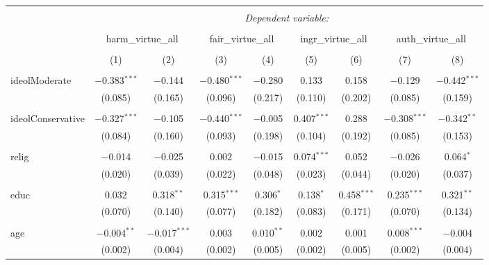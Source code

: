 
\begin{table}[!htbp] \centering 
  \caption{} 
  \label{} 
\begin{tabular}{@{\extracolsep{5pt}}lcccccccc} 
\\[-1.8ex]\hline 
\hline \\[-1.8ex] 
 & \multicolumn{8}{c}{\textit{Dependent variable:}} \\ 
\cline{2-9} 
\\[-1.8ex] & \multicolumn{2}{c}{harm\_virtue\_all} & \multicolumn{2}{c}{fair\_virtue\_all} & \multicolumn{2}{c}{ingr\_virtue\_all} & \multicolumn{2}{c}{auth\_virtue\_all} \\ 
\\[-1.8ex] & (1) & (2) & (3) & (4) & (5) & (6) & (7) & (8)\\ 
\hline \\[-1.8ex] 
 ideolModerate & $-$0.383$^{***}$ & $-$0.144 & $-$0.480$^{***}$ & $-$0.280 & 0.133 & 0.158 & $-$0.129 & $-$0.442$^{***}$ \\ 
  & (0.085) & (0.165) & (0.096) & (0.217) & (0.110) & (0.202) & (0.085) & (0.159) \\ 
  & & & & & & & & \\ 
 ideolConservative & $-$0.327$^{***}$ & $-$0.105 & $-$0.440$^{***}$ & $-$0.005 & 0.407$^{***}$ & 0.288 & $-$0.308$^{***}$ & $-$0.342$^{**}$ \\ 
  & (0.084) & (0.160) & (0.093) & (0.198) & (0.104) & (0.192) & (0.085) & (0.153) \\ 
  & & & & & & & & \\ 
 relig & $-$0.014 & $-$0.025 & 0.002 & $-$0.015 & 0.074$^{***}$ & 0.052 & $-$0.026 & 0.064$^{*}$ \\ 
  & (0.020) & (0.039) & (0.022) & (0.048) & (0.023) & (0.044) & (0.020) & (0.037) \\ 
  & & & & & & & & \\ 
 educ & 0.032 & 0.318$^{**}$ & 0.315$^{***}$ & 0.306$^{*}$ & 0.138$^{*}$ & 0.458$^{***}$ & 0.235$^{***}$ & 0.321$^{**}$ \\ 
  & (0.070) & (0.140) & (0.077) & (0.182) & (0.083) & (0.171) & (0.070) & (0.134) \\ 
  & & & & & & & & \\ 
 age & $-$0.004$^{**}$ & $-$0.017$^{***}$ & 0.003 & 0.010$^{**}$ & 0.002 & 0.001 & 0.008$^{***}$ & $-$0.004 \\ 
  & (0.002) & (0.004) & (0.002) & (0.005) & (0.002) & (0.005) & (0.002) & (0.004) \\ 

\end{tabular}
\end{table}
